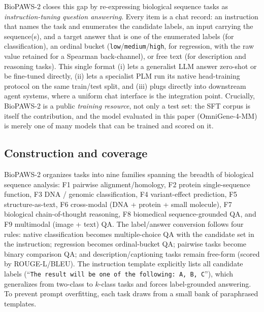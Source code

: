 BioPAWS-2 closes this gap by re-expressing biological sequence tasks as
\emph{instruction-tuning question answering}. Every item is a chat record: an instruction
that names the task and enumerates the candidate labels, an input carrying the sequence(s),
and a target answer that is one of the enumerated labels (for classification), an ordinal
bucket (\texttt{low}/\texttt{medium}/\texttt{high}, for regression, with the raw value
retained for a Spearman back-channel), or free text (for description and reasoning tasks).
This single format (i) lets a generalist LLM answer zero-shot or be fine-tuned directly,
(ii) lets a specialist PLM run its native head-training protocol on the same train/test
split, and (iii) plugs directly into downstream agent systems, where a uniform chat
interface is the integration point. Crucially, BioPAWS-2 is a public \emph{training
resource}, not only a test set: the SFT corpus is itself the contribution, and the model
evaluated in this paper (OmniGene-4-MM) is merely one of many models that can be trained
and scored on it.

\subsection{Construction and coverage}

BioPAWS-2 organizes tasks into nine families spanning the breadth of biological sequence
analysis: F1 pairwise alignment/homology, F2 protein single-sequence function, F3 DNA /
genomic classification, F4 variant-effect prediction, F5 structure-as-text, F6 cross-modal
(DNA + protein + small molecule), F7 biological chain-of-thought reasoning, F8 biomedical
sequence-grounded QA, and F9 multimodal (image + text) QA. The label/answer conversion
follows four rules: native classification becomes multiple-choice QA with the candidate
set in the instruction; regression becomes ordinal-bucket QA; pairwise tasks become binary
comparison QA; and description/captioning tasks remain free-form (scored by ROUGE-L/BLEU).
The instruction template explicitly lists all candidate labels (``\texttt{The result will
be one of the following: A, B, C}''), which generalizes from two-class to $k$-class tasks
and forces label-grounded answering. To prevent prompt overfitting, each task draws from a
small bank of paraphrased templates.

